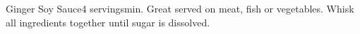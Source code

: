 \begin{recipe}{Ginger Soy Sauce}{4 servings}{\unit[5]{min.}}
\freeform Great served on meat, fish or vegetables.
\freeform Whisk all ingredients together until sugar is dissolved.
\end{recipe}
